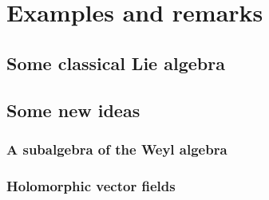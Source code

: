 
%
%

\chapter{Examples and remarks}

\section{Some classical Lie algebra}
\label{sec:chap8_ClassicalExamples}



\section{Some new ideas}
\label{sec:chap8_NewExamples}

\subsection{A subalgebra of the Weyl algebra}

\subsection{Holomorphic vector fields}